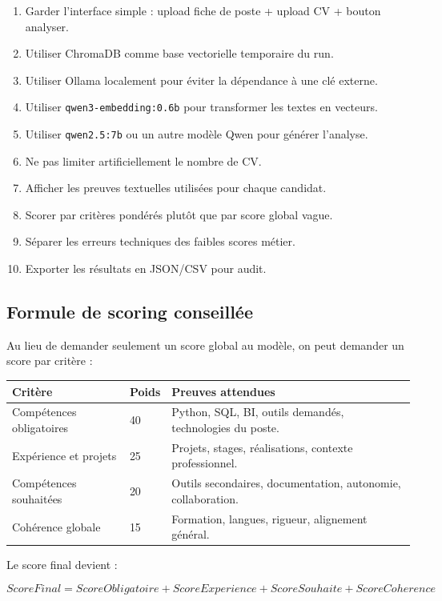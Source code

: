 \documentclass[12pt,a4paper]{article}
\begin{document}
\begin{enumerate}
  \item Garder l'interface simple : upload fiche de poste + upload CV + bouton analyser.
  \item Utiliser ChromaDB comme base vectorielle temporaire du run.
  \item Utiliser Ollama localement pour éviter la dépendance à une clé externe.
  \item Utiliser \texttt{qwen3-embedding:0.6b} pour transformer les textes en vecteurs.
  \item Utiliser \texttt{qwen2.5:7b} ou un autre modèle Qwen pour générer l'analyse.
  \item Ne pas limiter artificiellement le nombre de CV.
  \item Afficher les preuves textuelles utilisées pour chaque candidat.
  \item Scorer par critères pondérés plutôt que par score global vague.
  \item Séparer les erreurs techniques des faibles scores métier.
  \item Exporter les résultats en JSON/CSV pour audit.
\end{enumerate}

\subsection{Formule de scoring conseillée}

Au lieu de demander seulement un score global au modèle, on peut demander un score par critère :

\begin{longtable}{|p{5cm}|p{2.5cm}|p{6cm}|}
\hline
\textbf{Critère} & \textbf{Poids} & \textbf{Preuves attendues} \\
\hline
Compétences obligatoires & 40 & Python, SQL, BI, outils demandés, technologies du poste. \\
\hline
Expérience et projets & 25 & Projets, stages, réalisations, contexte professionnel. \\
\hline
Compétences souhaitées & 20 & Outils secondaires, documentation, autonomie, collaboration. \\
\hline
Cohérence globale & 15 & Formation, langues, rigueur, alignement général. \\
\hline
\end{longtable}

Le score final devient :

\[
ScoreFinal = ScoreObligatoire + ScoreExperience + ScoreSouhaite + ScoreCoherence
\]
\end{document}
